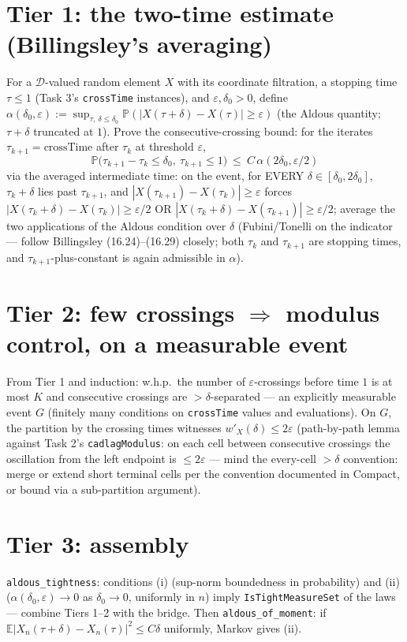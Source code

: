 \documentclass[11pt]{article}
\theoremstyle{plain}
\theoremstyle{remark}
\newcommand{\E}{\mathbb{E}}\newcommand{\PP}{\mathbb{P}}\newcommand{\R}{\mathbb{R}}
\newcommand{\D}{\mathcal D}\newcommand{\eps}{\varepsilon}
\begin{document}
\section*{Tier 1: the two-time estimate (Billingsley's averaging)}

For a $\D$-valued random element $X$ with its coordinate filtration, a
stopping time $\tau\le1$ (Task 3's \texttt{crossTime} instances), and
$\eps,\delta_0>0$, define
$\alpha(\delta_0,\eps):=\sup_{\tau,\ \delta\le\delta_0}
\PP(|X(\tau+\delta)-X(\tau)|\ge\eps)$ (the Aldous quantity; $\tau+\delta$
truncated at $1$). Prove the consecutive-crossing bound: for the iterates
$\tau_{k+1}=\mathrm{crossTime}$ after $\tau_k$ at threshold $\eps$,
\[
  \PP\big(\tau_{k+1}-\tau_k\le\delta_0,\ \tau_{k+1}\le1\big)
  \ \le\ C\,\alpha(2\delta_0,\eps/2)
\]
via the averaged intermediate time: on the event, for EVERY
$\delta\in[\delta_0,2\delta_0]$, $\tau_k+\delta$ lies past $\tau_{k+1}$, and
$|X(\tau_{k+1})-X(\tau_k)|\ge\eps$ forces
$|X(\tau_k+\delta)-X(\tau_k)|\ge\eps/2$ OR
$|X(\tau_k+\delta)-X(\tau_{k+1})|\ge\eps/2$; average the two applications of
the Aldous condition over $\delta$ (Fubini/Tonelli on the indicator ---
follow Billingsley (16.24)--(16.29) closely; both $\tau_k$ and $\tau_{k+1}$
are stopping times, and $\tau_{k+1}$-plus-constant is again admissible in
$\alpha$).

\section*{Tier 2: few crossings $\Rightarrow$ modulus control, on a
measurable event}

From Tier 1 and induction: w.h.p.\ the number of $\eps$-crossings before time
$1$ is at most $K$ and consecutive crossings are $>\delta$-separated ---
an explicitly measurable event $G$ (finitely many conditions on
\texttt{crossTime} values and evaluations). On $G$, the partition by the
crossing times witnesses $w'_X(\delta)\le2\eps$ (path-by-path lemma against
Task 2's \texttt{cadlagModulus}: on each cell between consecutive crossings
the oscillation from the left endpoint is $\le2\eps$ --- mind the every-cell
$>\delta$ convention: merge or extend short terminal cells per the convention
documented in Compact, or bound via a sub-partition argument).

\section*{Tier 3: assembly}

\texttt{aldous\_tightness}: conditions (i) (sup-norm boundedness in
probability) and (ii) ($\alpha(\delta_0,\eps)\to0$ as $\delta_0\to0$,
uniformly in $n$) imply \texttt{IsTightMeasureSet} of the laws --- combine
Tiers 1--2 with the bridge. Then \texttt{aldous\_of\_moment}: if
$\E|X_n(\tau+\delta)-X_n(\tau)|^2\le C\delta$ uniformly, Markov gives (ii).
\end{document}
